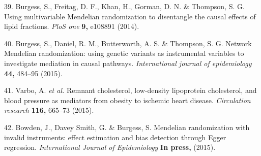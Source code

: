 \documentclass[]{article}
\begin{document}
\hypertarget{ref-Burgess2014a}{}
39. Burgess, S., Freitag, D. F., Khan, H., Gorman, D. N. \& Thompson, S.
G. Using multivariable Mendelian randomization to disentangle the causal
effects of lipid fractions. \emph{PloS one} \textbf{9,} e108891 (2014).

\hypertarget{ref-Burgess2015}{}
40. Burgess, S., Daniel, R. M., Butterworth, A. S. \& Thompson, S. G.
Network Mendelian randomization: using genetic variants as instrumental
variables to investigate mediation in causal pathways.
\emph{International journal of epidemiology} \textbf{44,} 484--95
(2015).

\hypertarget{ref-Varbo2015}{}
41. Varbo, A. \emph{et al.} Remnant cholesterol, low-density lipoprotein
cholesterol, and blood pressure as mediators from obesity to ischemic
heart disease. \emph{Circulation research} \textbf{116,} 665--73 (2015).

\hypertarget{ref-Bowden2015}{}
42. Bowden, J., Davey Smith, G. \& Burgess, S. Mendelian randomization
with invalid instruments: effect estimation and bias detection through
Egger regression. \emph{International Journal of Epidemiology}
\textbf{In press,} (2015).
\end{document}

